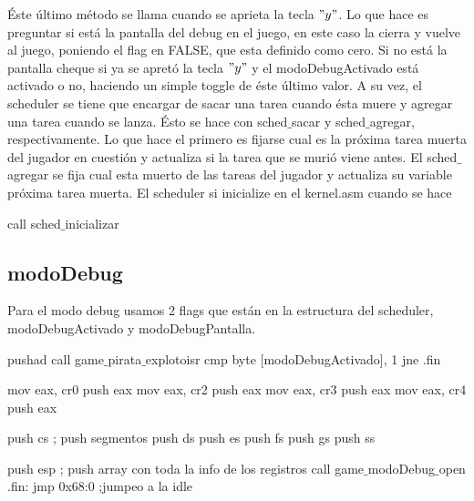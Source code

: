 Éste último método se llama cuando se aprieta la tecla $"y"$. Lo que hace es preguntar si está la pantalla del debug en el juego, en este caso la cierra y vuelve al juego, poniendo el flag en FALSE, que esta definido como cero. Si no está la pantalla cheque si ya se apretó la tecla $"y"$ y el modoDebugActivado está activado o no, haciendo un simple toggle de éste último valor.
\newline
A su vez, el scheduler se tiene que encargar de sacar una tarea cuando ésta muere y agregar una tarea cuando se lanza. Ésto se hace con sched$\_$sacar y sched$\_$agregar, respectivamente. Lo que hace el primero es fijarse cual es la próxima tarea muerta del jugador en cuestión y actualiza si la tarea que se murió viene antes. El sched$\_$agregar se fija cual esta muerto de las tareas del jugador y actualiza su variable próxima tarea muerta.
\newline
El scheduler si inicialize en el kernel.asm cuando se hace
\begin{algorithmic}
\State call sched$\_$inicializar
\end{algorithmic}


\subsection{modoDebug}
Para el modo debug usamos 2 flags que están en la estructura del scheduler, modoDebugActivado y modoDebugPantalla.
\begin{algorithmic}
	\State \tab pushad
    \State \tab call game$\_$pirata$\_$explotoisr
    \State \tab cmp byte [modoDebugActivado], 1
    \State \tab jne .fin
    
    \State \tab mov eax, cr0
    \State \tab push eax
    \State \tab mov eax, cr2
    \State \tab push eax
    \State \tab mov eax, cr3
    \State \tab push eax
    \State \tab mov eax, cr4
    \State \tab push eax

    \State \tab push cs ; push segmentos
    \State \tab push ds
    \State \tab push es
    \State \tab push fs
    \State \tab push gs
    \State \tab push ss

    \State \tab push esp ; push array con toda la info de los registros
    \State \tab call game$\_$modoDebug$\_$open
  	\State .fin:
    \State \tab jmp 0x68:0 ;jumpeo a la idle\end{algorithmic}

